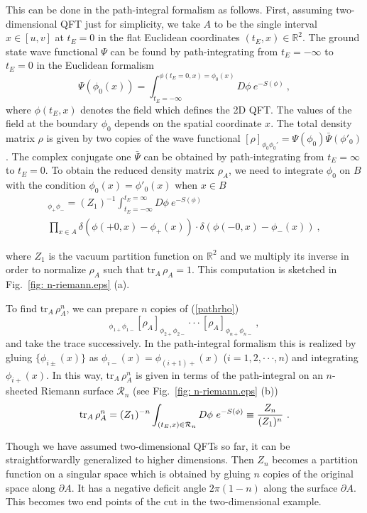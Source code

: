 \documentclass[12pt]{article}
\def\frac#1#2{{#1\over #2}}
\def\de{\partial}
\def\f {\frac}
\def\ddd{\cdot\cdot\cdot}
\def\frac#1#2{{#1\over #2}}
\def\be{\begin{equation}}
\def\ee{\end{equation}}
\begin{document}
This can be done in the path-integral formalism as follows.
First, assuming two-dimensional QFT just for simplicity,
we take
$A$ to be the single interval $x\in [u,v]$ at $t_E=0$ in
the flat Euclidean coordinates $(t_E,x)\in \mathbb{R}^{2}$. The
ground state wave functional $\Psi$ can be found by path-integrating
from $t_{E}=-\infty$ to $t_{E}=0$ in the Euclidean formalism \be
\Psi\left(\phi_0(x)\right)=
\int^{\phi(t_{E}=0,x)=\phi_0(x)}_{t_{E}=-\infty} D\phi~
e^{-S(\phi)} \ ,\ee where $\phi(t_E,x)$ denotes the field which defines
the 2D QFT.
The values of the field at the boundary $\phi_0$ depends
on the spatial coordinate $x$. The total density matrix $\rho$ is
given by two copies of the wave functional
$[\rho]_{\phi_0\phi_0'}=\Psi(\phi_0)\bar{\Psi}(\phi'_0)$. The
complex conjugate one $\bar{\Psi}$ can be obtained by
path-integrating from $t_{E}=\infty$ to $t_{E}=0$. To obtain the
reduced density matrix $\rho_A$, we need to integrate $\phi_0$ on
$B$ with the condition $\phi_{0}(x)=\phi'_0(x)$ when $x\in B$
\begin{multline}
[\rho_A]_{\phi_+ \phi_-}=(Z_{1})^{-1}\int
^{t_E=\infty}_{t_{E}=-\infty} D\phi~ e^{-S(\phi)}\\
\prod_{x\in
A}\delta\left(\phi(+0,x)-\phi_+(x)\right)\cdot
\delta\left(\phi(-0,x)-\phi_-(x)\right) \ , \label{pathrho}
\end{multline}

where
$Z_1$ is the vacuum partition function on $\mathbb{R}^{2}$ and we
multiply its inverse in order to normalize $\rho_A$ such that
$\mathrm{tr}_A\,\rho_A=1$. This computation is sketched in Fig.\
\ref{fig: n-riemann.eps} (a).


To find $\mathrm{tr}_A\,\rho_A^n$, we can prepare $n$ copies of
(\ref{pathrho}) \be [\rho_A]_{\phi_{1+}
\phi_{1-}}[\rho_A]_{\phi_{2+} \phi_{2-}}\ddd [\rho_A]_{\phi_{n+}
\phi_{n-}} \ ,\ee and take the trace successively. In the path-integral
formalism this is realized by gluing $\{\phi_{i\pm}(x)\}$ as
$\phi_{i-}(x)=\phi_{(i+1)+}(x)$ ($i=1,2,\ddd,n$) and integrating
$\phi_{i+}(x)$. In this way, $\mathrm{tr}_A\,\rho_A^n$ is given in
terms of the path-integral on an $n$-sheeted Riemann surface
${\mathcal R}_n$ (see Fig.\ \ref{fig: n-riemann.eps} (b)) \be
\mathrm{tr}_A\,\rho_A^n=(Z_1)^{-n}\int_{(t_E,x)\in {\mathcal R}_n}
D\phi~ e^{-S(\phi)}\equiv \f{Z_n}{(Z_1)^n} \ . \label{nsheetp}  \ee

Though we have assumed two-dimensional
QFTs so far, it can be straightforwardly generalized to
higher dimensions. Then $Z_n$ becomes a partition function on a singular space which is
obtained by gluing $n$ copies of the original space along $\de A$. It has a negative deficit
angle $2\pi (1-n)$ along the surface $\de A$. This becomes two end points of the cut in the
two-dimensional example.
\end{document}
